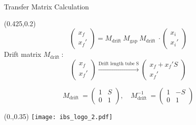 \documentclass[10pt,aspectratio=169]{beamer}
\begin{document}
\begin{frame}{Transfer Matrix Calculation}
    \begin{textblock*}{0.5\paperwidth}(0.425\paperwidth,0.2\paperheight)
        \centering
        \begin{equation*}
            \begin{pmatrix}x_f \\ x_f'\end{pmatrix} = M_\text{drift  } M_\text{gap  } M_\text{drift  } \cdot \begin{pmatrix}x_i \\ x_i'\end{pmatrix}
        \end{equation*}
        Drift matrix $M_\text{drift  }$: 
        \begin{equation*}
            \begin{pmatrix}x_f \\ x_f'\end{pmatrix} \xrightarrow{\text{Drift length tube S}} \begin{pmatrix} x_f + x_f' S \\ x_f'\end{pmatrix}
        \end{equation*}

        \begin{equation*}
            M_\text{drift  } = \begin{pmatrix} 1 & S \\ 0 & 1 \end{pmatrix}, \quad  M_\text{drift  }^{-1} = \begin{pmatrix} 1 & -S \\ 0 & 1 \end{pmatrix}
        \end{equation*}

            
    \end{textblock*}
    \begin{textblock*}{0.5\paperwidth}(0.\paperwidth,0.35\paperheight)
		\centering
		\texttt{[image: ibs\_logo\_2.pdf]}
	\end{textblock*}

\end{frame}
\end{document}
